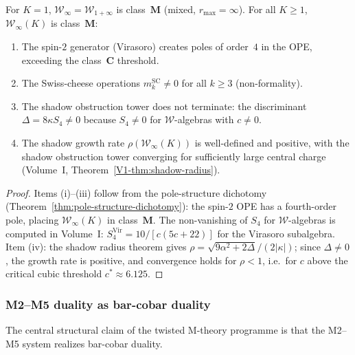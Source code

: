 \begin{proposition}
\label{prop:M5-shadow-archetype}
For $K = 1$, $\mathcal{W}_\infty = \mathcal{W}_{1+\infty}$ is
class~$\mathbf{M}$ \textup{(}mixed, $r_{\max} = \infty$\textup{)}.
For all $K \ge 1$, $\mathcal{W}_\infty(K)$ is class~$\mathbf{M}$:
\begin{enumerate}[label=\textup{(\roman*)},nosep]
\item The spin-$2$ generator \textup{(}Virasoro\textup{)} creates
 poles of order~$4$ in the OPE, exceeding the class~$\mathbf{C}$
 threshold.
\item The Swiss-cheese operations $m_k^{\mathrm{SC}} \ne 0$ for
 all $k \ge 3$ \textup{(}non-formality\textup{)}.
\item The shadow obstruction tower does not terminate: the discriminant
 $\Delta = 8\kappa S_4 \ne 0$ because $S_4 \ne 0$ for
 $\mathcal{W}$-algebras with $c \ne 0$.
\item The shadow growth rate $\rho(\mathcal{W}_\infty(K))$
 is well-defined and positive, with the shadow obstruction tower
 converging for sufficiently large central charge
 (Volume~I, Theorem~\ref*{V1-thm:shadow-radius}).
\end{enumerate}
\end{proposition}

\begin{proof}
Items (i)--(iii) follow from the pole-structure
dichotomy
(Theorem~\ref{thm:pole-structure-dichotomy}):
the spin-$2$ OPE has a fourth-order pole,
placing $\mathcal{W}_\infty(K)$ in class~$\mathbf{M}$.
The non-vanishing of $S_4$ for $\mathcal{W}$-algebras
is computed in Volume~I:
$S_4^{\mathrm{Vir}} = 10/[c(5c + 22)]$
for the Virasoro subalgebra.
Item (iv): the shadow radius theorem gives
$\rho = \sqrt{9\alpha^2 + 2\Delta}/(2|\kappa|)$;
since $\Delta \ne 0$, the growth rate is positive,
and convergence holds for $\rho < 1$, i.e.\
for $c$ above the critical cubic threshold
$c^* \approx 6.125$.
\end{proof}

\subsubsection{M2--M5 duality as bar-cobar duality}

The central structural claim of the twisted M-theory programme
is that the M2--M5 system realizes bar-cobar duality.

